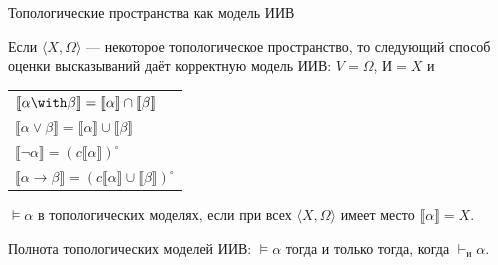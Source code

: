 \documentclass[aspectratio=169]{beamer}
\begin{document}
\begin{frame}{Топологические пространства как модель ИИВ}
\begin{thmrus}Если $\langle X, \Omega\rangle$ --- некоторое топологическое пространство, то следующий способ оценки высказываний
даёт корректную модель ИИВ: $V = \Omega$, $\text{И} = X$ и 
\begin{tabular}{l}
$\llbracket \alpha \with \beta \rrbracket = \llbracket \alpha \rrbracket \cap \llbracket \beta \rrbracket$\\
$\llbracket \alpha \vee \beta \rrbracket = \llbracket \alpha \rrbracket \cup \llbracket \beta \rrbracket$\\
$\llbracket \neg\alpha \rrbracket = (c\llbracket \alpha \rrbracket)^\circ$\\
$\llbracket \alpha \rightarrow \beta \rrbracket = (c\llbracket \alpha \rrbracket \cup \llbracket \beta \rrbracket)^\circ$
\end{tabular}
\end{thmrus}

\begin{defrus}
$\models\alpha$ в топологических моделях, если при всех $\langle X,\Omega\rangle$ имеет место $\llbracket \alpha \rrbracket = X$.
\end{defrus}

\begin{thmrus}Полнота топологических моделей ИИВ: $\models\alpha$ тогда и только тогда, когда $\vdash_\text{и}\alpha$.
\end{thmrus}

\end{frame}
\end{document}
